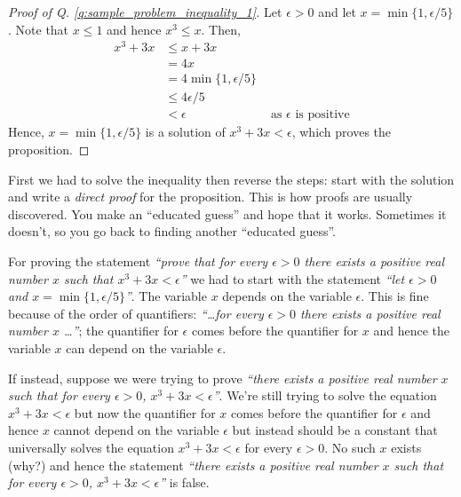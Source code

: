 \begin{proof}[Proof of Q. \ref{q:sample_problem_inequality_1}]
	Let $\epsilon > 0$ and let $x = \min \{ 1, {\epsilon}/{5}\}$. Note that $x \le 1$ and hence $x^3 \le x$. Then,
	\begin{align*}
		x^3 + 3x
		&\le x + 3x \\
		&= 4x \\
		&= 4 \min  \{ 1, {\epsilon}/{5}\} \\
		&\le 4 \epsilon /5 \\
		&< \epsilon & \mbox{ as $\epsilon$ is positive}
	\end{align*}
	Hence, $x= \min \{ 1, {\epsilon}/{5}\}$ is a solution of $x^3 + 3x < \epsilon$, which proves the proposition.
\end{proof}
First we had to solve the inequality then reverse the steps: start with the solution and write a {\it direct proof} for the proposition. This is how proofs are usually discovered. You make an ``educated guess'' and hope that it works. Sometimes it doesn't, so you go back to finding another ``educated guess''.


\begin{remark}
	 For proving the statement {\it``prove that for every $\epsilon > 0$ there exists a positive real number $x$ such that $x^3 + 3x < \epsilon$''} we had to start with the statement {\it ``let $\epsilon > 0$ and $x = \min \{ 1, {\epsilon}/{5}\}$''}.
	 The variable $x$ depends on the variable $\epsilon$.
	 This is fine because of the order of quantifiers: {\it``\dots for every $\epsilon > 0$ there exists a positive real number $x$ \dots''}; the quantifier for $\epsilon$ comes before the quantifier for $x$ and hence the variable $x$ can depend on the variable $\epsilon$.

	If instead, suppose we were trying to prove {\it ``there exists a positive real number $x$ such that for every $\epsilon > 0$, $x^3 + 3x < \epsilon$''}.
	We're still trying to solve the equation $x^3 + 3x < \epsilon$ but now the quantifier for $x$ comes before the quantifier for $\epsilon$ and hence $x$ cannot depend on the variable $\epsilon$ but instead should be a constant that universally solves the equation $x^3 + 3x < \epsilon$ for every $\epsilon > 0$.
	No such $x$ exists (why?) and hence the statement {\it ``there exists a positive real number $x$ such that for every $\epsilon > 0$, $x^3 + 3x < \epsilon$''} is false.
\end{remark}

